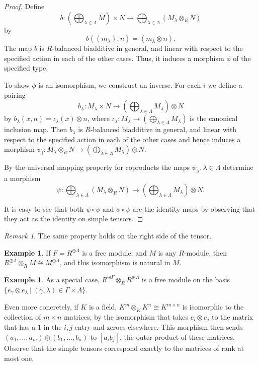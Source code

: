 \documentclass{amsart}[12pt]
\numberwithin{equation}{section}
\theoremstyle{plain} %
\theoremstyle{definition}
\newtheorem{ex}[equation]{Example}
\theoremstyle{remark}
\newtheorem{rem}[equation]{Remark}
\begin{document}
\begin{proof} Define 
$$
b: \left(\bigoplus_{\lambda\in\Lambda} M\right) \times N\to \bigoplus_{\lambda\in\Lambda}  \left(M_\lambda \otimes_R N\right)
$$
by 
$$
b((m_\lambda) , n) = (m_\lambda \otimes n).
$$
The map $b$ is $R$-balanced biadditive in general, and linear with respect to the specified action in each of the other cases. Thus, it induces a morphism $\phi$ of the specified type.

To show $\phi$  is an isomorphism, we construct an inverse. 
For each $i$ we define a pairing
$$
b_\lambda: M_\lambda \times N \to \left(\bigoplus_{\lambda\in\Lambda} M_\lambda \right) \otimes N 
$$
by $b_\lambda(x, n) = \iota_\lambda(x) \otimes n$, where $\iota_\lambda: M_\lambda \to \left( \bigoplus_{\lambda\in\Lambda} M_\lambda \right)$ is the canonical inclusion map.
Then $b_\lambda$ is $R$-balanced biadditive in general, and linear with respect to the specified action in each of the other cases and hence induces a morphism
$\psi_i:  M_\lambda \otimes_R N \to \left(\bigoplus_{\lambda \in \Lambda} M_\lambda \right) \otimes N$.

By the universal mapping property for coproducts the maps $\psi_\lambda, \lambda\in \Lambda$ 
determine a morphism 
$$
\psi:  \bigoplus_{\lambda\in\Lambda} (M_\lambda \otimes_R N) \to \left(\bigoplus_{\lambda \in \Lambda} M_\lambda \right) \otimes N.
$$

It is easy to see that both $\psi \circ \phi$ and $\phi \circ \psi$ are the identity maps by observing that they act as the identity on simple tensors.
\end{proof}

\begin{rem} The same property holds on the right side of the tensor.
\end{rem}

\begin{ex} If $F=R^{\oplus \Lambda}$ is a free module, and $M$ is any $R$-module, then $R^{\oplus \Lambda} \otimes_R M \cong M^{\oplus \Lambda}$, and this isomorphism is natural in $M$.
\end{ex}

\begin{ex} As a special case, $R^{\oplus \Gamma} \otimes_R R^{\oplus \Lambda}$ is a free module on the basis $\{e_\gamma \otimes e_\lambda \ | \ (\gamma,\lambda)\in \Gamma\times\Lambda\}$. 

Even more concretely, if $K$ is a field, $K^m \otimes_K K^n \cong K^{m\times n}$ is isomorphic to the collection of $m\times n$ matrices, by the isomorphism that takes $e_i\otimes e_j$ to the matrix that has a $1$ in the $i,j$ entry and zeroes elsewhere. This morphism then sends $(a_1,\dots,a_m)\otimes (b_1,\dots,b_n)$ to $[a_i b_j]$, the outer product of these matrices. Observe that the simple tensors correspond exactly to the matrices of rank at most one.
\end{ex}
\end{document}
